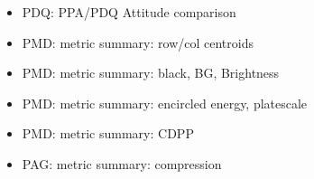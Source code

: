 % 
% 
% 
% 
% 
%
\begin{itemize}
    \item PDQ: PPA/PDQ Attitude comparison
    \item PMD: metric summary: row/col centroids
    \item PMD: metric summary: black, BG, Brightness
    \item PMD: metric summary: encircled energy, platescale
    \item PMD: metric summary: CDPP
    \item PAG: metric summary: compression
\end{itemize}

